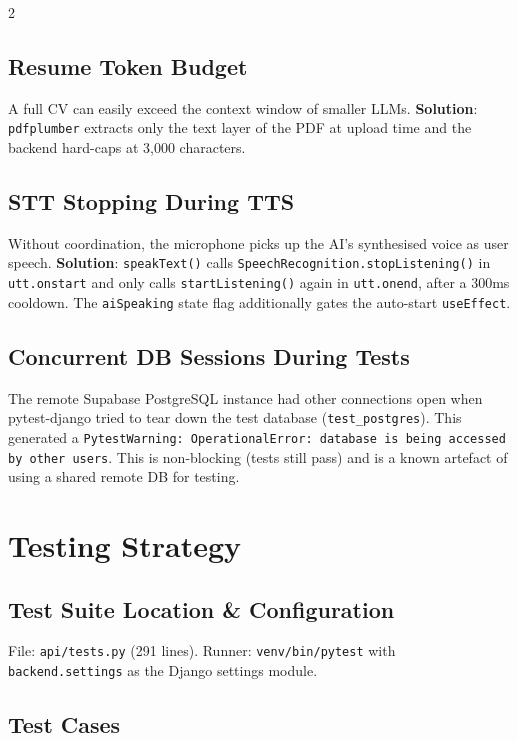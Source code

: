 \documentclass[10pt, a4paper]{article}
\begin{document}
\begin{multicols}{2}
\subsection{Resume Token Budget}
A full CV can easily exceed the context window of smaller LLMs.
\textbf{Solution}: \texttt{pdfplumber} extracts only the text layer of
the PDF at upload time and the backend hard-caps at 3,000 characters.

\subsection{STT Stopping During TTS}
Without coordination, the microphone picks up the AI's synthesised voice
as user speech. \textbf{Solution}: \texttt{speakText()} calls
\texttt{SpeechRecognition.stopListening()} in \texttt{utt.onstart} and
only calls \texttt{startListening()} again in \texttt{utt.onend}, after
a 300ms cooldown. The \texttt{aiSpeaking} state flag additionally gates
the auto-start \texttt{useEffect}.

\subsection{Concurrent DB Sessions During Tests}
The remote Supabase PostgreSQL instance had other connections open when
pytest-django tried to tear down the test database
(\texttt{test\_postgres}). This generated a
\texttt{PytestWarning: OperationalError: database is being accessed by
other users}. This is non-blocking (tests still pass) and is a known
artefact of using a shared remote DB for testing.

\section{Testing Strategy}

\subsection{Test Suite Location \& Configuration}
File: \texttt{api/tests.py} (291 lines).
Runner: \texttt{venv/bin/pytest} with \texttt{backend.settings} as the
Django settings module.

\subsection{Test Cases}


\end{multicols}
\end{document}
